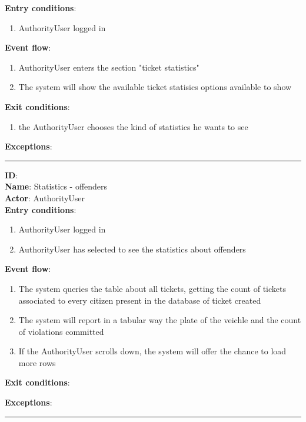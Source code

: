     \textbf{Entry conditions}:
    \begin{enumerate}
      \item{AuthorityUser logged in}
    \end{enumerate}
    \textbf{Event flow}:
    \begin{enumerate}
      \item {AuthorityUser enters the section "ticket statistics"}
      \item {The system will show the available ticket statisics options available to show}
    \end{enumerate}
    \textbf{Exit conditions}:
    \begin{enumerate}
      \item{the AuthorityUser chooses the kind of statistics he wants to see}
    \end{enumerate}
    \textbf{Exceptions}:
    \begin{enumerate}
    \end{enumerate}
    \rule{\linewidth}{0.4pt}
    \textbf{ID}:  \\
    \textbf{Name}: Statistics - offenders \\
    \textbf{Actor}: AuthorityUser   \\
    \textbf{Entry conditions}:
    \begin{enumerate}
      \item{AuthorityUser logged in}
      \item{AuthorityUser has selected to see the statistics about offenders }
    \end{enumerate}
    \textbf{Event flow}:
    \begin{enumerate}
      \item{The system queries the table about all tickets, getting the count of tickets associated to every citizen present in the database of ticket created}
      \item{The system will report in a tabular way the plate of the veichle and the count of violations committed}
      \item{If the AuthorityUser scrolls down, the system will offer the chance to load more rows}
    \end{enumerate}
    \textbf{Exit conditions}:
    \begin{enumerate}

    \end{enumerate}
    \textbf{Exceptions}:
    \begin{enumerate}

    \end{enumerate}
    \rule{\linewidth}{0.4pt}

